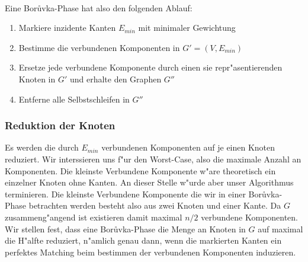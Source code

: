 \\
Eine Bor\r uvka-Phase hat also den folgenden Ablauf:
\begin{enumerate}
    \item Markiere inzidente Kanten $E_{min}$ mit minimaler Gewichtung
    \item Bestimme die verbundenen Komponenten in $G' = (V,E_{min})$
    \item Ersetze jede verbundene Komponente durch einen sie repr"asentierenden
          Knoten in $G'$ und erhalte den Graphen $G''$
    \item Entferne alle Selbstschleifen in $G''$
\end{enumerate}

\subsubsection{Reduktion der Knoten}
Es werden die durch $E_{min}$ verbundenen Komponenten auf je einen Knoten 
    reduziert.
    Wir interssieren uns f"ur den Worst-Case, also die maximale Anzahl an 
    Komponenten.
    Die kleinste Verbundene Komponente w"are theoretisch ein
    einzelner Knoten ohne Kanten.
    An dieser Stelle w"urde aber unser Algorithmus terminieren.
    Die kleinste Verbundene Komponente die wir in einer Bor\r uvka-Phase 
    betrachten werden besteht also aus zwei Knoten und einer Kante.
    Da $G$ zusammeng"angend ist existieren damit maximal $n/2$ verbundene
    Komponenten.\\
Wir stellen fest, dass eine Bor\r uvka-Phase die Menge an Knoten in $G$ auf 
    maximal die H"alfte reduziert, n"amlich genau dann, wenn die markierten 
    Kanten ein perfektes Matching beim bestimmen der verbundenen Komponenten
    induzieren.\\
